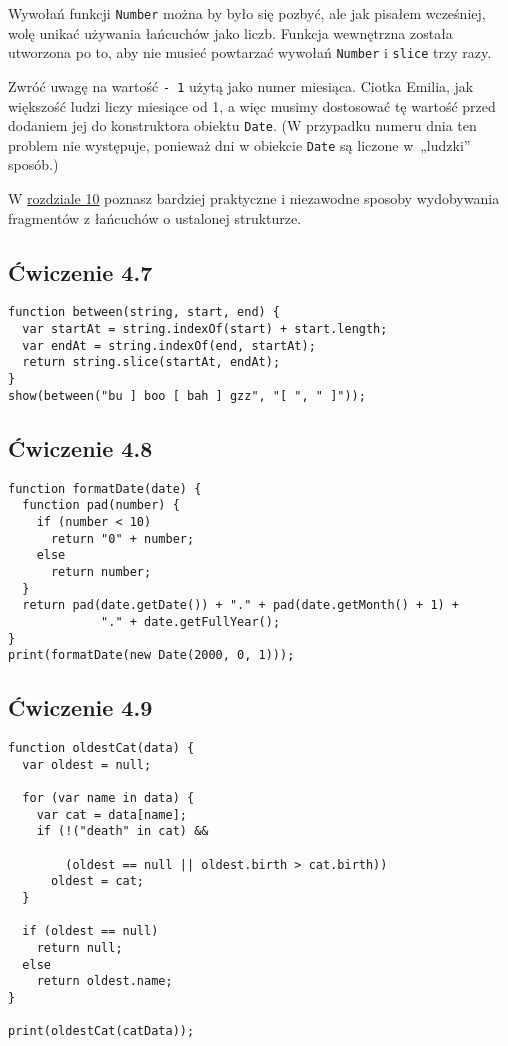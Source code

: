 Wywołań funkcji \texttt{Number} można by było się pozbyć, ale jak pisałem wcześniej, wolę unikać używania łańcuchów jako liczb. Funkcja wewnętrzna została utworzona po to, aby nie musieć powtarzać wywołań \texttt{Number} i \texttt{slice} trzy razy.

      
Zwróć uwagę na wartość \texttt{- 1} użytą jako numer miesiąca. Ciotka Emilia, jak większość ludzi liczy miesiące od 1, a więc musimy dostosować tę wartość przed dodaniem jej do konstruktora obiektu \texttt{Date}. (W przypadku numeru dnia ten problem nie występuje, ponieważ dni w obiekcie \texttt{Date} są liczone w~„ludzki” sposób.)

      
W \hyperref[chap:10]{rozdziale 10} poznasz bardziej praktyczne i niezawodne sposoby wydobywania fragmentów z łańcuchów o ustalonej strukturze.

    
\subsection*{Ćwiczenie 4.7}
\label{sol:4.7}   
 
\begin{verbatim} 
function between(string, start, end) {
  var startAt = string.indexOf(start) + start.length;
  var endAt = string.indexOf(end, startAt);
  return string.slice(startAt, endAt);
}
show(between("bu ] boo [ bah ] gzz", "[ ", " ]"));
 \end{verbatim}
    

\subsection*{Ćwiczenie 4.8}
\label{sol:4.8}

\begin{verbatim} 
function formatDate(date) {
  function pad(number) {
    if (number < 10)
      return "0" + number;
    else
      return number;
  }
  return pad(date.getDate()) + "." + pad(date.getMonth() + 1) +
             "." + date.getFullYear();
}
print(formatDate(new Date(2000, 0, 1)));
 \end{verbatim}


\subsection*{Ćwiczenie 4.9}
\label{sol:4.9}

\begin{verbatim} 
function oldestCat(data) {
  var oldest = null;

  for (var name in data) {
    var cat = data[name];
    if (!("death" in cat) &&

        (oldest == null || oldest.birth > cat.birth))
      oldest = cat;
  }

  if (oldest == null)
    return null;
  else
    return oldest.name;
}

print(oldestCat(catData));
 \end{verbatim}
      

